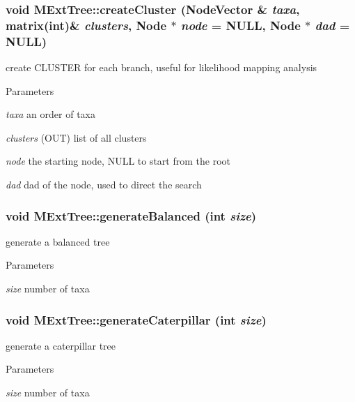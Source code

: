 \hypertarget{classMExtTree_a39d9c5216f1c8cad04b50972a2c83897}{
\subsubsection[{createCluster}]{\setlength{\rightskip}{0pt plus 5cm}void MExtTree::createCluster (NodeVector \& {\em taxa}, \/  matrix(int)\& {\em clusters}, \/  {\bf Node} $\ast$ {\em node} = {\ttfamily NULL}, \/  {\bf Node} $\ast$ {\em dad} = {\ttfamily NULL})}}
\label{classMExtTree_a39d9c5216f1c8cad04b50972a2c83897}
create CLUSTER for each branch, useful for likelihood mapping analysis 
\begin{DoxyParams}{Parameters}
\item[{\em taxa}]an order of taxa \item[{\em clusters}](OUT) list of all clusters \item[{\em node}]the starting node, NULL to start from the root \item[{\em dad}]dad of the node, used to direct the search \end{DoxyParams}
\hypertarget{classMExtTree_aace82df578f02396df24b7dde3ae81bc}{
\subsubsection[{generateBalanced}]{\setlength{\rightskip}{0pt plus 5cm}void MExtTree::generateBalanced (int {\em size})}}
\label{classMExtTree_aace82df578f02396df24b7dde3ae81bc}
generate a balanced tree 
\begin{DoxyParams}{Parameters}
\item[{\em size}]number of taxa \end{DoxyParams}
\hypertarget{classMExtTree_aedaa4579940f46a5a4becde25856d8b4}{
\subsubsection[{generateCaterpillar}]{\setlength{\rightskip}{0pt plus 5cm}void MExtTree::generateCaterpillar (int {\em size})}}
\label{classMExtTree_aedaa4579940f46a5a4becde25856d8b4}
generate a caterpillar tree 
\begin{DoxyParams}{Parameters}
\item[{\em size}]number of taxa \end{DoxyParams}
